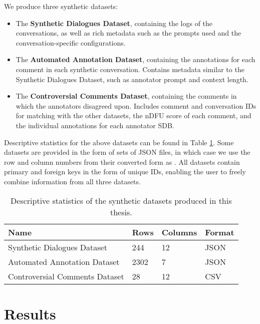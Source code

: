 We produce three synthetic datasets:

\begin{itemize}
	\item The \textbf{Synthetic Dialogues Dataset}, containing the logs of the conversations, as well as rich metadata such as the prompts used and the conversation-specific configurations.
	
	\item The \textbf{Automated Annotation Dataset}, containing the annotations for each comment in each synthetic conversation. Contains metadata similar to the Synthetic Dialogues Dataset, such as annotator prompt and context length.
	
	\item The \textbf{Controversial Comments Dataset}, containing the comments in which the annotators disagreed upon. Includes comment and conversation IDs for matching with the other datasets, the \ac{nDFU} \cite{pavlopoulos-likas-2024-polarized} score of each comment, and the individual annotations for each annotator \ac{SDB}.
\end{itemize}

Descriptive statistics for the above datasets can be found in Table \ref{tab:datasets}. Some datasets are provided in the form of sets of \ac{JSON} files, in which case we use the row and column numbers from their converted form as . All datasets contain primary and foreign keys in the form of unique IDs, enabling the user to freely combine information from all three datasets.


\begin{table}
	\begin{tabular}
		{ |p{6cm}|p{1cm}|p{1.5cm}|p{2cm}|}
		\hline
		\cellcolor{blue!25}\textbf{Name} & \cellcolor{blue!25}\textbf{Rows} & \cellcolor{blue!25}\textbf{Columns} & \cellcolor{blue!25}\textbf{Format}\\
		\hline
		Synthetic Dialogues Dataset & 244 & 12 & JSON\\
		\hline
		Automated Annotation Dataset & 2302 & 7 & JSON\\
		\hline
		Controversial Comments Dataset & 28 & 12 & CSV\\
		\hline
	\end{tabular}
	\caption{Descriptive statistics of the synthetic datasets produced in this thesis.}
	\label{tab:datasets}
\end{table}


\section{Results}
\label{sec:evaluation:analysis}

